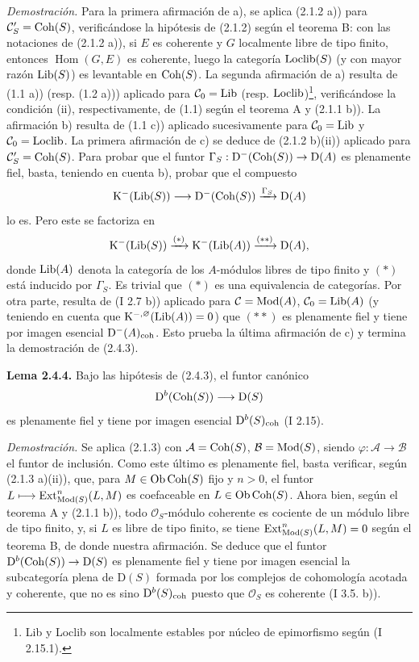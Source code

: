 \emph{Demostración.} Para la primera afirmación de a), se aplica (2.1.2 a)) para $\mathcal C'_S=\operatorname{Coh}(S)$, verificándose la hipótesis de (2.1.2) según el teorema B: con las notaciones de (2.1.2 a)), si $E$ es coherente y $G$ localmente libre de tipo finito, entonces $\operatorname{Hom}(G,E)$ es coherente, luego la categoría $\operatorname{Loclib}(S)$ (y con mayor razón $\operatorname{Lib}(S)$) es levantable en $\operatorname{Coh}(S)$. La segunda afirmación de a) resulta de (1.1 a)) (resp. (1.2 a))) aplicado para $\mathcal C_0=\operatorname{Lib}$ (resp. $\operatorname{Loclib}$)\footnote{Lib y Loclib son localmente estables por núcleo de epimorfismo según (I 2.15.1).}, verificándose la condición (ii), respectivamente, de (1.1) según el teorema A y (2.1.1 b)). La afirmación b) resulta de (1.1 c)) aplicado sucesivamente para $\mathcal C_0=\operatorname{Lib}$ y $\mathcal C_0=\operatorname{Loclib}$. La primera afirmación de c) se deduce de (2.1.2 b)(ii)) aplicado para $\mathcal C'_S=\operatorname{Coh}(S)$. Para probar que el funtor $\Gamma_S:\mathrm D^{-}(\operatorname{Coh}(S))\to\mathrm D(A)$ es plenamente fiel, basta, teniendo en cuenta b), probar que el compuesto
\[
\mathrm K^{-}(\operatorname{Lib}(S))\longrightarrow\mathrm D^{-}(\operatorname{Coh}(S))\xrightarrow{\Gamma_S}\mathrm D(A)
\]
lo es. Pero este se factoriza en
\[
\mathrm K^{-}(\operatorname{Lib}(S))\xrightarrow{(*)}\mathrm K^{-}(\operatorname{Lib}(A))\xrightarrow{(**)}\mathrm D(A),
\]
donde $\operatorname{Lib}(A)$ denota la categoría de los $A$-módulos libres de tipo finito y $(*)$ está inducido por $\Gamma_S$. Es trivial que $(*)$ es una equivalencia de categorías. Por otra parte, resulta de (I 2.7 b)) aplicado para $\mathcal C=\operatorname{Mod}(A)$, $\mathcal C_0=\operatorname{Lib}(A)$ (y teniendo en cuenta que $\mathrm K^{-,\varnothing}(\operatorname{Lib}(A))=0$) que $(**)$ es plenamente fiel y tiene por imagen esencial $\mathrm D^{-}(A)_{\mathrm{coh}}$. Esto prueba la última afirmación de c) y termina la demostración de (2.4.3).

\textbf{Lema 2.4.4.} Bajo las hipótesis de (2.4.3), el funtor canónico
\[
\mathrm D^b(\operatorname{Coh}(S))\longrightarrow\mathrm D(S)
\]
es plenamente fiel y tiene por imagen esencial $\mathrm D^b(S)_{\mathrm{coh}}$ (I 2.15).

\emph{Demostración.} Se aplica (2.1.3) con $\mathcal A=\operatorname{Coh}(S)$, $\mathcal B=\operatorname{Mod}(S)$, siendo $\varphi:\mathcal A\to\mathcal B$ el funtor de inclusión. Como este último es plenamente fiel, basta verificar, según (2.1.3 a)(ii)), que, para $M\in\operatorname{Ob}\operatorname{Coh}(S)$ fijo y $n>0$, el funtor $L\longmapsto \operatorname{Ext}^n_{\operatorname{Mod}(S)}(L,M)$ es coefaceable en $L\in\operatorname{Ob}\operatorname{Coh}(S)$. Ahora bien, según el teorema A y (2.1.1 b)), todo $\mathcal O_S$-módulo coherente es cociente de un módulo libre de tipo finito, y, si $L$ es libre de tipo finito, se tiene $\operatorname{Ext}^n_{\operatorname{Mod}(S)}(L,M)=0$ según el teorema B, de donde nuestra afirmación. Se deduce que el funtor $\mathrm D^b(\operatorname{Coh}(S))\to\mathrm D(S)$ es plenamente fiel y tiene por imagen esencial la subcategoría plena de $\mathrm D(S)$ formada por los complejos de cohomología acotada y coherente, que no es sino $\mathrm D^b(S)_{\mathrm{coh}}$ puesto que $\mathcal O_S$ es coherente (I 3.5. b)).

